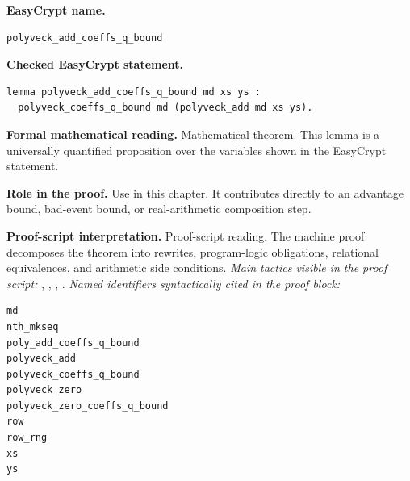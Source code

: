 \begin{formaltheorem}
\noindent\textbf{EasyCrypt name.}
\begin{lstlisting}[language=EasyCrypt,basicstyle=\ttfamily\scriptsize]
polyveck_add_coeffs_q_bound
\end{lstlisting}
\noindent\textbf{Checked EasyCrypt statement.}
\begin{lstlisting}[language=EasyCrypt,basicstyle=\ttfamily\scriptsize]
lemma polyveck_add_coeffs_q_bound md xs ys :
  polyveck_coeffs_q_bound md (polyveck_add md xs ys).
\end{lstlisting}
\noindent\textbf{Formal mathematical reading.}
Mathematical theorem. This lemma is a universally quantified proposition over the variables shown in the EasyCrypt statement.

\noindent\textbf{Role in the proof.}
Use in this chapter. It contributes directly to an advantage bound, bad-event bound, or real-arithmetic composition step.

\noindent\textbf{Proof-script interpretation.}
Proof-script reading. The machine proof decomposes the theorem into rewrites, program-logic obligations, relational equivalences, and arithmetic side conditions.
\emph{Main tactics visible in the proof script:} , , , .
\emph{Named identifiers syntactically cited in the proof block:}
\begin{lstlisting}[language=EasyCrypt,basicstyle=\ttfamily\scriptsize]
md
nth_mkseq
poly_add_coeffs_q_bound
polyveck_add
polyveck_coeffs_q_bound
polyveck_zero
polyveck_zero_coeffs_q_bound
row
row_rng
xs
ys
\end{lstlisting}

\end{formaltheorem}

